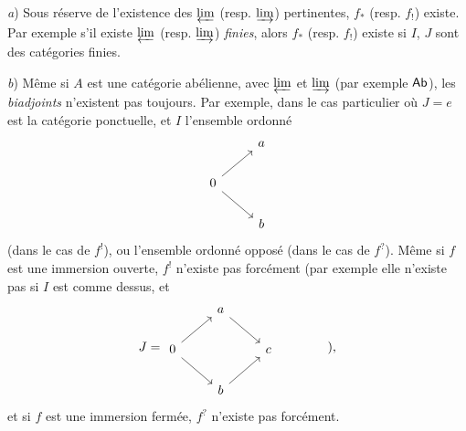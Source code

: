 \textit{a}) Sous réserve de l'existence des $\varprojlim$ (resp. $\varinjlim$) pertinentes, $f_{*}$ (resp. $f_{!}$) existe. Par exemple s'il existe $\varprojlim$ (resp. $\varinjlim$) \textit{finies}, alors $f_{*}$ (resp. $f_{!}$) existe si $I$, $J$ sont des catégories finies.

\textit{b}) Même si $A$ est une catégorie abélienne, avec $\varprojlim$ et $\varinjlim$ (par exemple $\mathsf{Ab}$), les \textit{biadjoints} n'existent pas toujours. Par exemple, dans le cas particulier où $J=e$ est la catégorie ponctuelle, et $I$ l'ensemble ordonné
\[
\begin{tikzcd}
 & a \\
0 \arrow[ur] \arrow[dr] & \\
 & b
\end{tikzcd}
\]
(dans le cas de $f^{!}$), ou l'ensemble ordonné opposé (dans le cas de $f^{?}$). Même si $f$ est une immersion ouverte, $f^{!}$ n'existe pas forcément (par exemple elle n'existe pas si $I$ est comme dessus, et
\[
J=\begin{tikzcd}
 & a \arrow[dr] & \\
0 \arrow[ur] \arrow[dr] & & c \\
 & b \arrow[ur] &
\end{tikzcd}
\qquad\qquad \text{),}
\]
et si $f$ est une immersion fermée, $f^{?}$ n'existe pas forcément.

